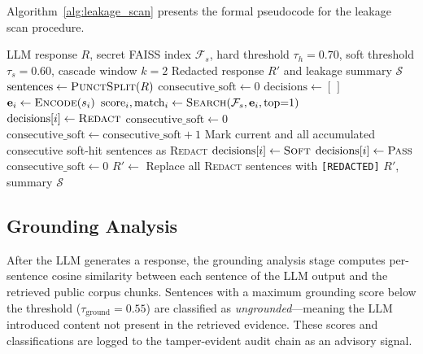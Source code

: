 \documentclass[journal]{IEEEtran}
\begin{document}
Algorithm~\ref{alg:leakage_scan} presents the formal pseudocode for the leakage scan procedure.

\begin{algorithm}[!ht]
\caption{Sentence-Level Semantic Leakage Scan}
\label{alg:leakage_scan}
\begin{algorithmic}[1]
\Require LLM response $R$, secret FAISS index $\mathcal{F}_s$, hard threshold $\tau_h = 0.70$, soft threshold $\tau_s = 0.60$, cascade window $k = 2$
\Ensure Redacted response $R'$ and leakage summary $\mathcal{S}$
\State $\text{sentences} \gets \textsc{PunctSplit}(R)$ 
\State $\text{consecutive\_soft} \gets 0$
\State $\text{decisions} \gets [\,]$
    \State $\mathbf{e}_i \gets \textsc{Encode}(s_i)$ 
    \State $\text{score}_i, \text{match}_i \gets \textsc{Search}(\mathcal{F}_s, \mathbf{e}_i, \text{top}{=}1)$
        \State $\text{decisions}[i] \gets \textsc{Redact}$ 
        \State $\text{consecutive\_soft} \gets 0$
        \State $\text{consecutive\_soft} \gets \text{consecutive\_soft} + 1$
            \State Mark current and all accumulated consecutive soft-hit sentences as \textsc{Redact}
        \Else
            \State $\text{decisions}[i] \gets \textsc{Soft}$
        \EndIf
    \Else
        \State $\text{decisions}[i] \gets \textsc{Pass}$
        \State $\text{consecutive\_soft} \gets 0$
    \EndIf
\EndFor
\State $R' \gets$ Replace all \textsc{Redact} sentences with \texttt{[REDACTED]}
\State \Return $R'$, summary $\mathcal{S}$
\end{algorithmic}
\end{algorithm}


\subsection{Grounding Analysis}
\label{Sect:Grounding_Validation}

After the LLM generates a response, the grounding analysis stage computes per-sentence cosine similarity between each sentence of the LLM output and the retrieved public corpus chunks. Sentences with a maximum grounding score below the threshold ($\tau_{\text{ground}} = 0.55$) are classified as \textit{ungrounded}---meaning the LLM introduced content not present in the retrieved evidence. These scores and classifications are logged to the tamper-evident audit chain as an advisory signal.
\end{document}
